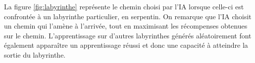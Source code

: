 La figure \ref{fig:labyrinthe} représente le chemin choisi par l'IA lorsque celle-ci est confrontée à un labyrinthe particulier, en serpentin. On remarque que l'IA choisit
un chemin qui l'amène à l'arrivée, tout en maximisant les récompenses obtenues sur le chemin. L'apprentissage sur d'autres labyrinthes générés aléatoirement
font également apparaître un apprentissage réussi et donc une capacité à atteindre la sortie du labyrinthe.

